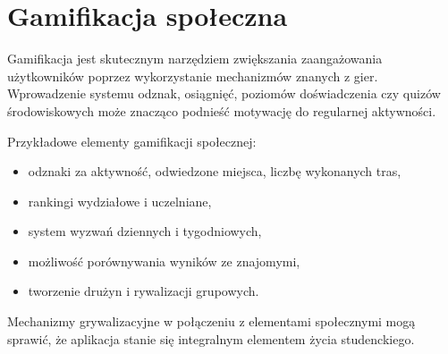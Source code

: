 \section{Gamifikacja społeczna}

Gamifikacja jest skutecznym narzędziem zwiększania zaangażowania użytkowników poprzez wykorzystanie mechanizmów znanych z gier. Wprowadzenie systemu odznak, osiągnięć, poziomów doświadczenia czy quizów środowiskowych może znacząco podnieść motywację do regularnej aktywności.

Przykładowe elementy gamifikacji społecznej:
\begin{itemize}
    \item odznaki za aktywność, odwiedzone miejsca, liczbę wykonanych tras,
    \item rankingi wydziałowe i uczelniane,
    \item system wyzwań dziennych i tygodniowych,
    \item możliwość porównywania wyników ze znajomymi,
    \item tworzenie drużyn i rywalizacji grupowych.
\end{itemize}

Mechanizmy grywalizacyjne w połączeniu z elementami społecznymi mogą sprawić, że aplikacja stanie się integralnym elementem życia studenckiego.

